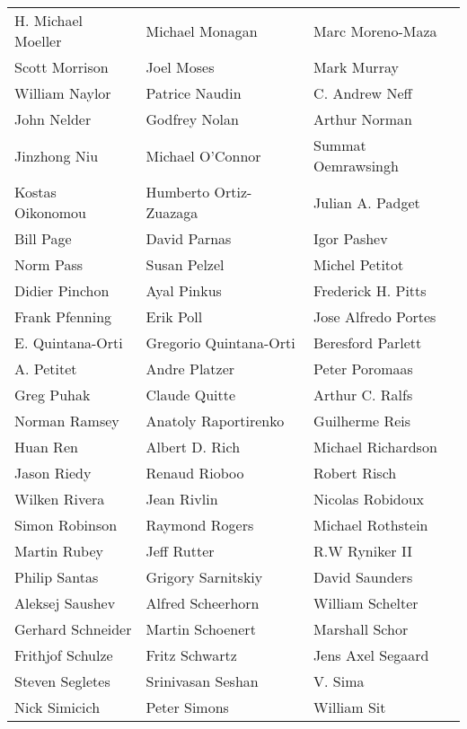 \begin{tabular}{lll}
H. Michael Moeller     & Michael Monagan        & Marc Moreno-Maza\\
Scott Morrison         & Joel Moses             & Mark Murray\\
William Naylor         & Patrice Naudin         & C. Andrew Neff\\
John Nelder            & Godfrey Nolan          & Arthur Norman\\
Jinzhong Niu           & Michael O'Connor       & Summat Oemrawsingh\\
Kostas Oikonomou       & Humberto Ortiz-Zuazaga & Julian A. Padget\\
Bill Page              & David Parnas           & Igor Pashev\\
Norm Pass              & Susan Pelzel           & Michel Petitot\\
Didier Pinchon         & Ayal Pinkus            & Frederick H. Pitts\\
Frank Pfenning         & Erik Poll              & Jose Alfredo Portes\\
E. Quintana-Orti       & Gregorio Quintana-Orti & Beresford Parlett\\
A. Petitet             & Andre Platzer          & Peter Poromaas\\
Greg Puhak             & Claude Quitte          & Arthur C. Ralfs\\
Norman Ramsey          & Anatoly Raportirenko   & Guilherme Reis\\
Huan Ren               & Albert D. Rich         & Michael Richardson\\
Jason Riedy            & Renaud Rioboo          & Robert Risch\\
Wilken Rivera          & Jean Rivlin            & Nicolas Robidoux\\
Simon Robinson         & Raymond Rogers         & Michael Rothstein\\
Martin Rubey           & Jeff Rutter            & R.W Ryniker II\\
Philip Santas          & Grigory Sarnitskiy     & David Saunders\\
Aleksej Saushev        & Alfred Scheerhorn      & William Schelter\\
Gerhard Schneider      & Martin Schoenert       & Marshall Schor\\
Frithjof Schulze       & Fritz Schwartz         & Jens Axel Segaard\\
Steven Segletes        & Srinivasan Seshan      & V. Sima\\
Nick Simicich          & Peter Simons           & William Sit\\
\end{tabular}
\vfill
\newpage


